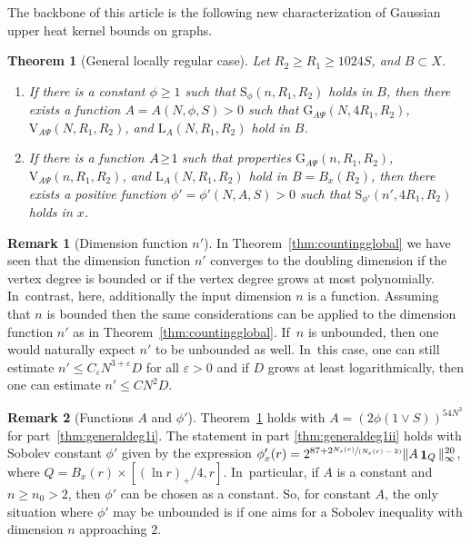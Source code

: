 \documentclass[10pt]{amsart}
\newenvironment{enumeratei}
{\bgroup\def\theenumi{\roman{enumi}}\def\theenumii{\arabic{enumii}}\begin{enumerate}}
{\end{enumerate}\egroup}
\newcommand{\spfrac}[2]{\sfrac{#1}{(#2)}}
\newcommand{\rG}{\mathrm{G}}
\newcommand{\rS}{\mathrm{S}}
\newcommand{\rV}{\mathrm{V}}
\newcommand{\rL}{\mathrm{L}}
\theoremstyle{plain}
\newtheorem{theorem}{Theorem}[section]
\theoremstyle{definition}
\newtheorem*{remark}{Remark}
\DeclareMathOperator{\Eins}{\mathbf{1}}
\begin{document}
The backbone of this article is the following new characterization of Gaussian upper heat kernel bounds on graphs.


\begin{theorem}[General locally regular case]\label{thm:generaldeg1}
Let
$R_2\geq R_1\geq {1024S}$, and $ B\subset X $.
\begin{enumeratei}
\item\label{thm:generaldeg1i}
If there is a constant $ \phi\ge 1 $ such that $\rS_\phi (n,R_1,R_2)$ holds in $B$, then {there exists a function $A=A(N,\phi,S)>0$} such that $\rG_{A\Psi}(N,4R_1,R_2)$, $\rV_{\!A\Psi}(N,R_1,R_2)$, and $\rL_{{A}}(N,R_1,R_2)$ hold in $B$.
\item\label{thm:generaldeg1ii}
If there is a function $A\!\geq\!1\mkern-2mu$ such that properties $\rG_{A\Psi}(n,R_1,R_2)$, $\rV_{\!A\Psi} (n,R_1,R_2)$, and $\rL_A(N,R_1,R_2)$ hold in $B=B_x(R_2)$, then there exists a positive function $\phi'=\allowbreak\phi'(N,A,S)>0$ such that $\rS_{\phi'}(n',4 R_1,R_2)$ holds in $x$.
\end{enumeratei}
\end{theorem}


\begin{remark}[Dimension function $n'$]
In Theorem~\ref{thm:countingglobal} we have seen that the dimension function $ n' $ converges to the doubling dimension if the vertex degree is bounded or if the vertex degree grows at most polynomially. In~contrast, here, additionally the input dimension $ n $ is a function. Assuming that $n$ is bounded then the same considerations can be applied to the dimension function $ n' $ as in Theorem~\ref{thm:countingglobal}. If~$n$ is unbounded, then one would naturally expect $n'$ to be unbounded as well. In~this case, one can still estimate $n' \leq C_\varepsilon N^{3+\varepsilon} D$ for all $\varepsilon>0$ and if $D$ grows at least logarithmically, then one can estimate $n' \leq C N^{2} D$.
\end{remark}

\begin{remark}[Functions $A$ and $\phi'$]Theorem~\ref{thm:generaldeg1} holds with
$A=(2\phi(1\vee S))^{54N^3}$ for part~\eqref{thm:generaldeg1i}. The statement in part \eqref{thm:generaldeg1ii} holds with Sobolev constant $\phi'$ given by the expression $\phi_x'(r) =2^{87+2 \spfrac{N_x(r)}{N_x(r)-2}}\Vert A\Eins_{Q}\Vert_\infty ^{20}$, where $Q=B_x(r)\times [(\ln r)_+/4,r]$. In~particular, if $A$ is a constant and $ n\ge n_{0}>2 $, then $\phi'$ can be chosen as a constant. So, for constant $A$, the only situation where $ \phi' $ may be unbounded is if one aims for a Sobolev inequality with dimension $n $ approaching $ 2 $.
\end{remark}
\end{document}
